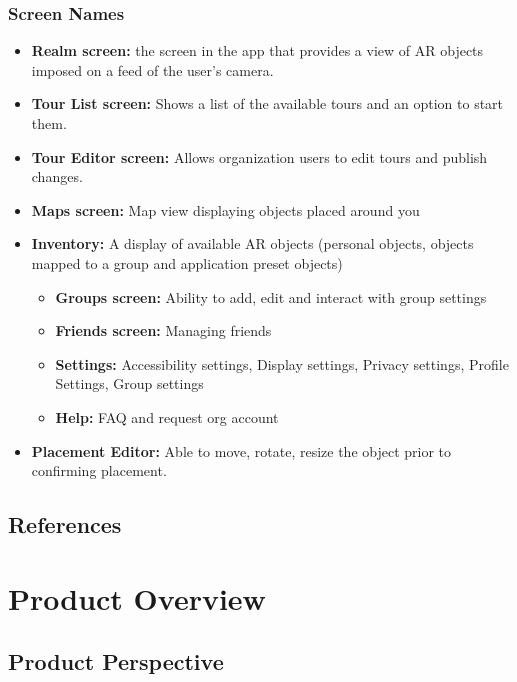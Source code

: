 \documentclass{article}
\begin{document}
\subsubsection{Screen Names}
\begin{itemize}
    \item \textbf{Realm screen:} the screen in the app that provides a view of AR objects imposed on a feed of the user’s camera.
    \item \textbf{Tour List screen:} Shows a list of the available tours and an option to start them.
    \item \textbf{Tour Editor screen:} Allows organization users to edit tours and publish changes.
    \item \textbf{Maps screen:} Map view displaying objects placed around you
    \item \textbf{Inventory:} A display of available AR objects (personal objects, objects mapped to a group and application preset objects)
    \begin{itemize}
        \item \textbf{Groups screen:} Ability to add, edit and interact with group settings
        \item \textbf{Friends screen:} Managing friends
        \item \textbf{Settings:} Accessibility settings, Display settings, Privacy settings, Profile Settings, Group settings
        \item \textbf{Help:} FAQ and request org account
    \end{itemize}
    \item \textbf{Placement Editor:} Able to move, rotate, resize the object prior to confirming placement.
\end{itemize}

\subsection{References}
\label{sub:references}

\begingroup
\raggedright

\endgroup



\section{Product Overview}

\subsection{Product Perspective}
\end{document}
